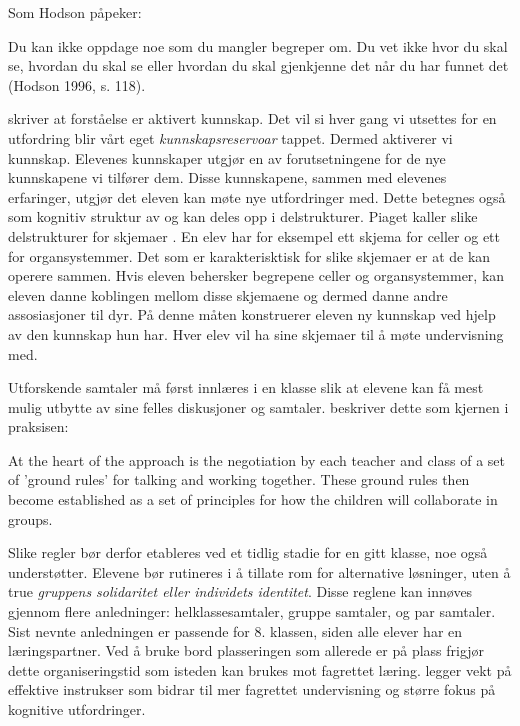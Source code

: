 \documentclass[main.tex]{subfiles}
\begin{document}
\begin{displayquote}
\guillemotleft Som Hodson påpeker:
\begin{displayquote}
Du kan ikke oppdage noe som du mangler begreper om. Du vet ikke hvor du skal se, hvordan du skal se 
eller hvordan du skal gjenkjenne det når du har funnet det (Hodson 1996, s. 118). \guillemotright
\end{displayquote}
\end{displayquote}
 skriver at forståelse er aktivert kunnskap. Det vil si hver gang vi utsettes 
for en utfordring blir vårt eget \emph{kunnskapsreservoar} tappet. Dermed aktiverer vi kunnskap. 
Elevenes kunnskaper utgjør en av forutsetningene for de nye kunnskapene vi tilfører dem. Disse 
kunnskapene, sammen med elevenes erfaringer, utgjør det eleven kan møte nye utfordringer med. Dette 
betegnes også som kognitiv struktur av \citeauthor{solv92} og kan deles opp i delstrukturer. Piaget 
kaller slike delstrukturer for skjemaer . En elev har for eksempel ett skjema 
for celler og ett for organsystemmer. Det som er karakterisktisk for slike skjemaer er at de kan 
operere sammen. Hvis eleven behersker begrepene celler og organsystemmer, kan eleven danne koblingen
mellom disse skjemaene og dermed danne andre assosiasjoner til dyr. På denne måten konstruerer 
eleven ny kunnskap ved hjelp av den kunnskap hun har. Hver elev vil ha sine skjemaer til å møte 
undervisning med.

Utforskende samtaler må først innlæres i en klasse slik at elevene kan få mest mulig
utbytte av sine felles diskusjoner og samtaler.  beskriver dette som kjernen i 
praksisen:
\begin{displayquote}
\guillemotleft
At the heart of the approach is the negotiation by each teacher and class of a set of 'ground
rules' for talking and working together. These ground rules then become established as a set of 
principles for how the children will collaborate in groups.
\guillemotright
\end{displayquote}
Slike regler bør derfor etableres ved et tidlig stadie for en gitt klasse, noe 
også understøtter. Elevene bør rutineres
i å tillate rom for alternative løsninger, uten å true \emph{gruppens solidaritet eller individets 
identitet}. Disse reglene kan innøves gjennom flere anledninger: helklassesamtaler, gruppe 
samtaler, og par samtaler. Sist nevnte anledningen er passende for 8. klassen, siden alle elever
har en læringspartner. Ved å bruke bord plasseringen som allerede er på plass frigjør dette 
organiseringstid som isteden kan brukes mot fagrettet læring.  legger vekt
på effektive instrukser som bidrar til mer fagrettet undervisning og større fokus på
kognitive utfordringer.
\end{document}

